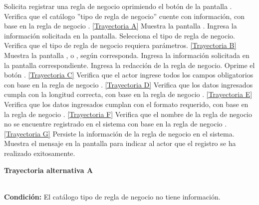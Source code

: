 	\begin{UCtrayectoria}
		\UCpaso[\UCactor] Solicita registrar una regla de negocio oprimiendo el botón  de la pantalla .
		\UCpaso[\UCsist] Verifica que el catálogo ''tipo de regla de negocio'' cuente con información, con base en la regla de negocio . \hyperlink{CU8-1:TAA}{[Trayectoria A]}
		\UCpaso[\UCsist] Muestra la pantalla .
		\UCpaso[\UCactor] Ingresa la información solicitada en la pantalla. \label{CU8.1-P3}
		\UCpaso[\UCactor] Selecciona el tipo de regla de negocio.
		\UCpaso[\UCsist] Verifica que el tipo de regla de negocio requiera parámetros. \hyperlink{CU8-1:TAB}{[Trayectoria B]}
		\UCpaso[\UCsist] Muestra la pantalla ,  o , según corresponda.
		\UCpaso[\UCactor] Ingresa la información solicitada en la pantalla correspondiente.
		\UCpaso[\UCactor] Ingresa la redacción de la regla de negocio. \label{CU8.1-P9}
		\UCpaso[\UCactor] Oprime el botón . \hyperlink{CU8-1:TAC}{[Trayectoria C]}
		\UCpaso[\UCsist] Verifica que el actor ingrese todos los campos obligatorios con base en la regla de negocio . \hyperlink{CU8-1:TAD}{[Trayectoria D]}
		\UCpaso[\UCsist] Verifica que los datos ingresados cumpla con la longitud correcta, con base en la regla de negocio . \hyperlink{CU8-1:TAE}{[Trayectoria E]}
		\UCpaso[\UCsist] Verifica que los datos ingresados cumplan con el formato requerido, con base en la regla de negocio . \hyperlink{CU8-1:TAF}{[Trayectoria F]}
		\UCpaso[\UCsist] Verifica que el nombre de la regla de negocio no se encuentre registrado en el sistema con base en la regla de negocio . \hyperlink{CU8-1:TAG}{[Trayectoria G]}
		\UCpaso[\UCsist] Persiste la información de la regla de negocio en el sistema.
		\UCpaso[\UCsist] Muestra el mensaje  en la pantalla  para indicar al actor que el registro se ha realizado exitosamente.
	\end{UCtrayectoria}		
\hypertarget{CU8-1:TAA}{\textbf{Trayectoria alternativa A}}\\
\noindent \textbf{Condición:} El catálogo tipo de regla de negocio no tiene información.

